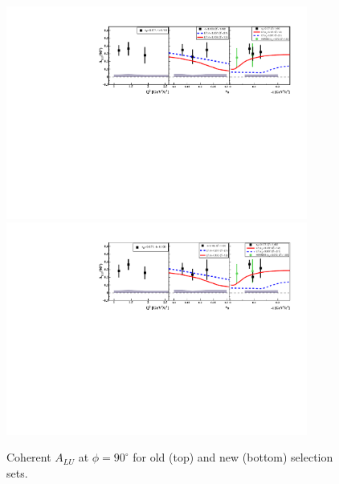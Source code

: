 \begin{figure}[h!]
\centering
\includegraphics[height=7.0cm]{old_plots/coherent-ALU_90.pdf}
\includegraphics[height=7.0cm]{new_plots/Coh_ALU_phi_90.pdf}
\caption{Coherent $A_{LU}$ at $\phi = 90^{\circ}$ for old (top) and new 
(bottom) selection sets.}
\label{fig:ALU_90}
\end{figure}


